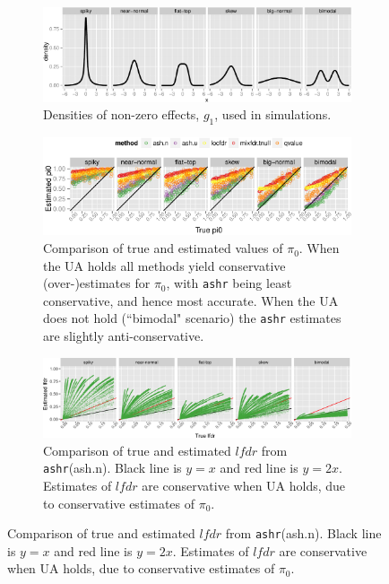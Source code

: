 \documentclass[11pt]{article}
\def\lfdr{\textit{lfdr}}
\def\ashr{{\tt ashr}\xspace}
\begin{document}
\begin{figure} 
\begin{center}
\begin{subfigure}{\textwidth}
	\includegraphics[width=\textwidth]{../analysis/figure/plot_egdens.Rmd/scenario_density-1.pdf} 
	\caption{Densities of non-zero effects, $g_1$, used in simulations.} \label{fig:altdens}
\end{subfigure}
\begin{subfigure}{\textwidth}
\includegraphics[width=\textwidth]{../analysis/figure/plot_pi0est.Rmd/plot_pi0est-1.pdf} 
\caption{Comparison of true and estimated values of $\pi_0$. When the UA holds all methods yield conservative (over-)estimates for $\pi_0$, with \ashr being least conservative, and hence most accurate. When the UA does not hold (``bimodal" scenario) the \ashr estimates are slightly anti-conservative.} \label{fig:pi0sims}
\end{subfigure}
\begin{subfigure}{\textwidth}
\includegraphics[width=\textwidth]{../analysis/figure/plot_lfsr.Rmd/plot_lfdr-1.png} 
\caption{Comparison of true and estimated $\lfdr$ from \ashr (ash.n). Black line is $y=x$ and red line is $y=2x$. Estimates of $\lfdr$ are conservative when UA holds, due to conservative estimates of $\pi_0$.} \label{fig:lfdr}
\end{subfigure}

\end{center}
\end{figure}
\end{document}

